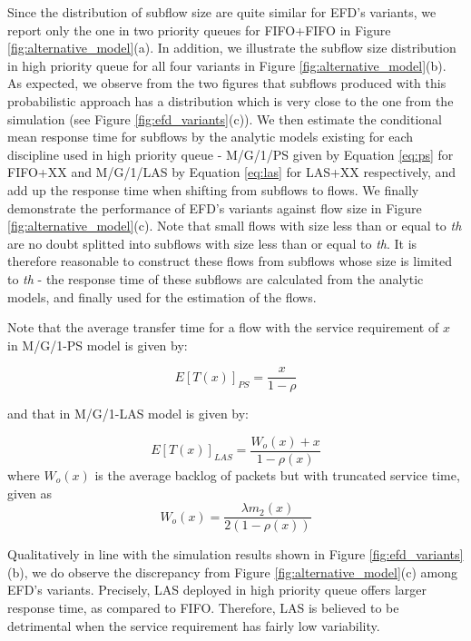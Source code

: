 \documentclass[preprint,12pt]{elsarticle}
\begin{document}
Since the distribution of subflow size are quite similar for EFD's variants, we report only the one in two priority queues for FIFO+FIFO in Figure \ref{fig:alternative_model}(a). In addition, we illustrate the subflow size distribution in high priority queue for all four variants in Figure \ref{fig:alternative_model}(b). As expected, we observe from the two figures that subflows produced with this probabilistic approach has a distribution which is very close to the one from the simulation (see Figure \ref{fig:efd_variants}(c)). We then estimate the conditional mean response time for subflows by the analytic models existing for each discipline used in high priority queue - M/G/1/PS given by Equation \ref{eq:ps} for FIFO+XX and M/G/1/LAS by Equation \ref{eq:las} for LAS+XX respectively, and add up the response time when shifting from subflows to flows. We finally demonstrate the performance of EFD's variants against flow size in Figure \ref{fig:alternative_model}(c). Note that small flows with size less than or equal to \textit{th} are no doubt splitted into subflows with size less than or equal to \textit{th}. It is therefore reasonable to construct these flows from subflows whose size is limited to \textit{th} - the response time of these subflows are calculated from the analytic models, and finally used for the estimation of the flows. 

Note that the average transfer time for a flow with the service requirement of $x$ in M/G/1-PS model is given by:

\begin{equation}
E[T(x)]_{PS} = \frac{x}{1-\rho}
\label{eq:ps}
\end{equation}

and that in M/G/1-LAS model is given by:

\begin{equation}
E[T(x)]_{LAS} = \frac{W_{o}(x) + x}{1-\rho(x)}
\label{eq:las}
\end{equation} 
where $W_{o}(x)$ is the average backlog of packets but with truncated service time, given as
\begin{equation}
W_{o}(x) = \frac{\lambda m_{2}(x)}{2(1-\rho(x))}
\end{equation} 

Qualitatively in line with the simulation results shown in Figure \ref{fig:efd_variants}(b), we do observe the discrepancy from Figure \ref{fig:alternative_model}(c) among EFD's variants. Precisely, LAS deployed in high priority queue offers larger response time, as compared to FIFO. Therefore, LAS is believed to be detrimental when the service requirement has fairly low variability. %
\end{document}
